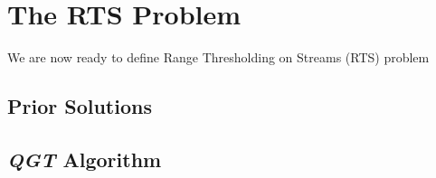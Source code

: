 \chapter{The RTS Problem}

We are now ready to define Range Thresholding on Streams (RTS) problem


\section{Prior Solutions}

\section{\textit{QGT} Algorithm}